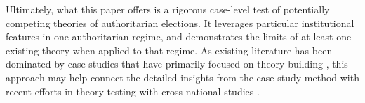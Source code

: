 \documentclass[12pt]{article}
\newcommand{\1}{\mathbbm{1}}
\begin{document}
Ultimately, what this paper offers is a rigorous case-level test of potentially competing theories of authoritarian elections. It leverages particular institutional features in one authoritarian regime, and demonstrates the limits of at least one existing theory when applied to that regime. As existing literature has been dominated by case studies that have primarily focused on theory-building \citep[e.g.][]{Magaloni2006, Blaydes2010}, this approach may help connect the detailed insights from the case study method with recent efforts in theory-testing with cross-national studies \citep[e.g.][]{Miller2015}.



\end{document}

